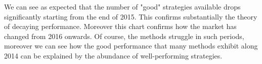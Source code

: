 We can see as expected that the number of "good" strategies available drops significantly starting from the end of 2015. This confirms substantially the theory of decaying performance. Moreover this chart confirms how the market has changed from 2016 onwards. Of course, the methods struggle in such periods, moreover we can see how the good performance that many methods exhibit along 2014 can be explained by the abundance of well-performing strategies.


